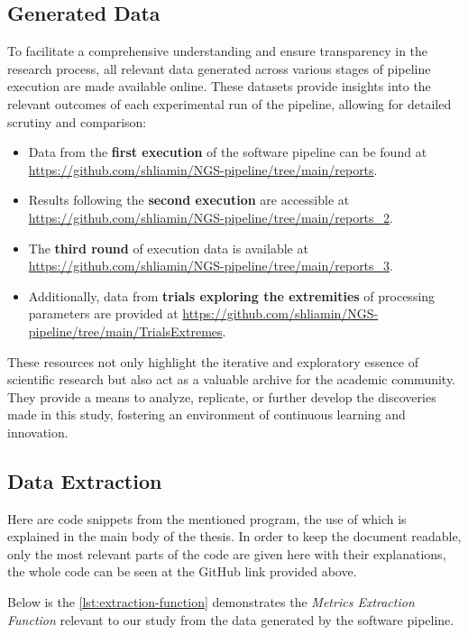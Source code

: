 \subsection{Generated Data}\label{sec:generated_data}

To facilitate a comprehensive understanding and ensure transparency in the research process, all relevant data generated across various stages of pipeline execution are made available online. These datasets provide insights into the relevant outcomes of each experimental run of the pipeline, allowing for detailed scrutiny and comparison:

\begin{itemize}
    \item Data from the \textbf{first execution} of the software pipeline can be found at \url{https://github.com/shliamin/NGS-pipeline/tree/main/reports}.
    \item Results following the \textbf{second execution} are accessible at \url{https://github.com/shliamin/NGS-pipeline/tree/main/reports_2}.
    \item The \textbf{third round} of execution data is available at \url{https://github.com/shliamin/NGS-pipeline/tree/main/reports_3}.
    \item Additionally, data from \textbf{trials exploring the extremities} of processing parameters are provided at \url{https://github.com/shliamin/NGS-pipeline/tree/main/TrialsExtremes}.
\end{itemize}

These resources not only highlight the iterative and exploratory essence of scientific research but also act as a valuable archive for the academic community. They provide a means to analyze, replicate, or further develop the discoveries made in this study, fostering an environment of continuous learning and innovation.

\subsection{Data Extraction}\label{sec:data_extraction}

Here are code snippets from the mentioned program, the use of which is explained in the main body of the thesis. In order to keep the document readable, only the most relevant parts of the code are given here with their explanations, the whole code can be seen at the GitHub link provided above.

Below is the \autoref{lst:extraction-function} demonstrates the \textit{Metrics Extraction Function} relevant to our study from the data generated by the software pipeline. 

